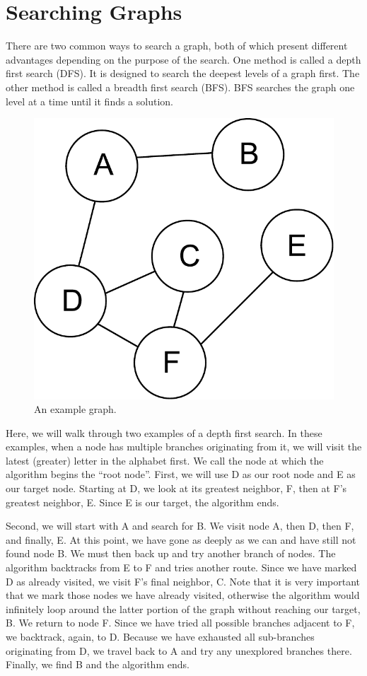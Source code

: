 \section*{Searching Graphs}
There are two common ways to search a graph, both of which present different advantages depending on the purpose of the search.
One method is called a depth first search (DFS).  It is designed to search the deepest levels of a graph first.
The other method is called a breadth first search (BFS).  BFS searches the graph one level at a time until it finds a solution.
\begin{figure}[h]
\centering
\includegraphics[width=.5\textwidth]{graph.pdf}
\caption{An example graph.}
\label{fig:bfs_dfs_graph}
\end{figure}


Here, we will walk through two examples of a depth first search.
In these examples, when a node has multiple branches originating from it,
we will visit the latest (greater) letter in the alphabet first.
We call the node at which the algorithm begins the ``root node''.
First, we will use D as our root node and E as our target node.
Starting at D, we look at its greatest neighbor, F, then at F's greatest
neighbor, E. Since E is our target, the algorithm ends.

Second, we will start with A and search for B.
We visit node A, then D, then F, and finally, E.
At this point, we have gone as deeply as we can and have still not found node B.
We must then back up and try another branch of nodes.
The algorithm backtracks from E to F and tries another route.
Since we have marked D as already visited, we visit F's final neighbor, C.
Note that it is very important that we mark those nodes we have already visited,
otherwise the algorithm would infinitely loop around the latter portion of
the graph without reaching our target, B. We return to node F. Since we have
tried all possible branches adjacent to F, we backtrack, again, to D. Because we have
exhausted all sub-branches originating from D, we travel back to A and try
any unexplored branches there. Finally, we find B and the algorithm ends.


